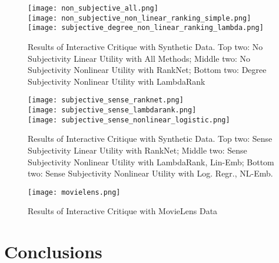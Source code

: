 \documentclass[manuscript,screen,nonacm]{acmart}
\newcommand{\1}{{\mathbf 1}}
\theoremstyle{TheoremNum}
\begin{document}
\begin{figure}
\centering
\captionsetup{width=.45\linewidth}
\begin{minipage}{.5\textwidth}
  \centering
\texttt{[image: non\_subjective\_all.png]} \\
\texttt{[image: non\_subjective\_non\_linear\_ranking\_simple.png]} \\
\texttt{[image: subjective\_degree\_non\_linear\_ranking\_lambda.png]} 
  \vspace{-0.1in}
\caption{Results of Interactive Critique with Synthetic Data. Top two: No Subjectivity Linear Utility with All Methods; Middle two: No Subjectivity Nonlinear Utility with RankNet; Bottom two: Degree Subjectivity Nonlinear Utility with LambdaRank}
  \vspace{-0.1in}
\label{fig:critique1}
\end{minipage}%
\begin{minipage}{.5\textwidth}
  \centering
\texttt{[image: subjective\_sense\_ranknet.png]} \\
\texttt{[image: subjective\_sense\_lambdarank.png]} \\
\texttt{[image: subjective\_sense\_nonlinear\_logistic.png]}
  \vspace{-0.1in}
\caption{Results of Interactive Critique with Synthetic Data. Top two: Sense Subjectivity Linear Utility with RankNet; Middle two: Sense Subjectivity Nonlinear Utility with LambdaRank, Lin-Emb; Bottom two: Sense Subjectivity Nonlinear Utility with Log. Regr., NL-Emb.}
  \vspace{-0.1in}
\label{fig:critique_subjective_sense}
\end{minipage}
\end{figure}


\begin{figure}
    \centering
\texttt{[image: movielens.png]}
  \vspace{-0.1in}
\caption{Results of Interactive Critique with MovieLens Data}
  \vspace{-0.1in}
\label{fig:critique_movielens}
\end{figure}



\section{Conclusions}
\label{sec:conclude}
\end{document}
